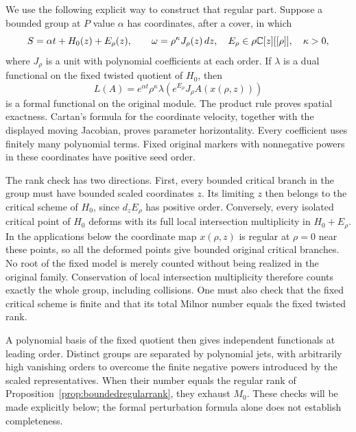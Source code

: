 We use the following explicit way to construct that regular part.
Suppose a bounded group at $P$ value $\alpha$ has coordinates,
after a cover, in which
\begin{equation}\label{eq:boundedfixedmodel}
 S=\alpha t+H_0(z)+E_\rho(z),\qquad
 \omega=\rho^\kappa J_\rho(z)\,dz,
 \quad E_\rho\in\rho\mathbb C[z][[\rho]],\quad\kappa>0,
\end{equation}
where $J_\rho$ is a unit with polynomial coefficients at each
order. If $\lambda$ is a dual functional on the fixed twisted
quotient of $H_0$, then
\[
 L(A)=e^{\alpha t}\rho^\kappa\lambda\!\left(
           e^{E_\rho}J_\rho A(x(\rho,z))\right)
\]
is a formal functional on the original module. The product rule
proves spatial exactness. Cartan's formula for the coordinate
velocity, together with the displayed moving Jacobian, proves
parameter horizontality. Every coefficient uses finitely many
polynomial terms. Fixed original markers with nonnegative powers
in these coordinates have positive seed order.

The rank check has two directions. First, every bounded critical
branch in the group must have bounded scaled coordinates $z$.
Its limiting $z$ then belongs to the critical scheme of $H_0$,
since $d_zE_\rho$ has positive order. Conversely, every isolated
critical point of $H_0$ deforms with its full local intersection
multiplicity in $H_0+E_\rho$. In the applications below the
coordinate map $x(\rho,z)$ is regular at $\rho=0$ near these
points, so all the deformed points give bounded original
critical branches. No root of the fixed model is merely counted
without being realized in the original family. Conservation of
local intersection multiplicity therefore counts exactly the
whole group, including collisions. One must also check that the
fixed critical scheme is finite and that its total Milnor number
equals the fixed twisted rank.

A polynomial basis of the fixed quotient then gives independent
functionals at leading order. Distinct groups are separated by
polynomial jets, with arbitrarily high vanishing orders to overcome
the finite negative powers introduced by the scaled representatives.
When their number equals the regular rank of
Proposition~\ref{prop:boundedregularrank}, they exhaust $M_0$.
These checks will be made explicitly below; the formal perturbation
formula alone does not establish completeness.
